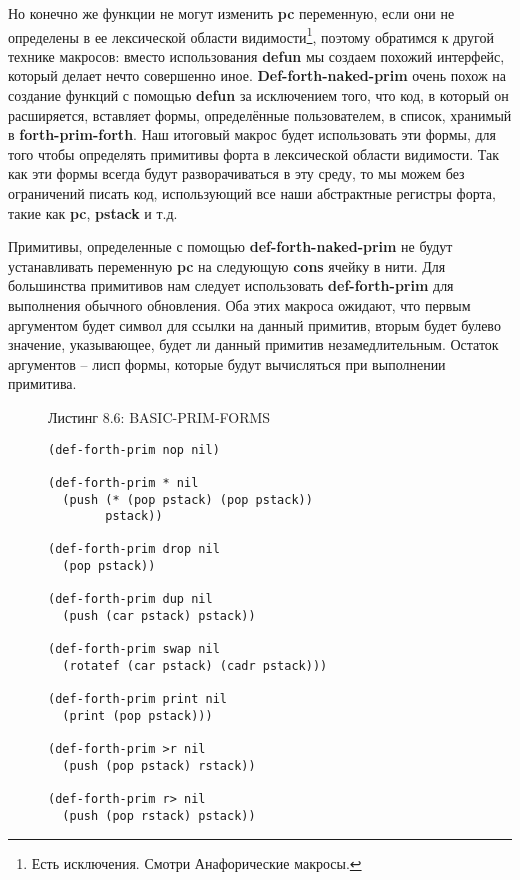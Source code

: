 Но конечно же функции не могут изменить \textbf{pc} переменную, если они не определены в ее лексической области видимости\footnote{Есть исключения. Смотри Анафорические макросы.}, поэтому обратимся к другой технике макросов: вместо использования \textbf{defun} мы создаем похожий интерфейс, который делает нечто совершенно иное. \textbf{Def-forth-naked-prim} очень похож на создание функций с помощью \textbf{defun} за исключением того, что код, в который он расширяется, вставляет формы, определённые пользователем, в список, хранимый в \textbf{forth-prim-forth}. Наш итоговый макрос будет использовать эти формы, для того чтобы определять примитивы форта в лексической области видимости. Так как эти формы всегда будут разворачиваться в эту среду, то мы можем без ограничений писать код, использующий все наши абстрактные регистры форта, такие как \textbf{pc}, \textbf{pstack} и т.д.

Примитивы, определенные с помощью \textbf{def-forth-naked-prim} не будут устанавливать переменную \textbf{pc} на следующую \textbf{cons} ячейку в нити. Для большинства примитивов нам следует использовать \textbf{def-forth-prim} для выполнения обычного обновления. Оба этих макроса ожидают, что первым аргументом будет символ для ссылки на данный примитив, вторым будет булево значение, указывающее, будет ли данный примитив незамедлительным. Остаток аргументов -- лисп формы, которые будут вычисляться при выполнении примитива.

\begin{figure}Листинг 8.6: BASIC-PRIM-FORMS\label{listing_8.6}
  \listbegin
\begin{verbatim}
(def-forth-prim nop nil)

(def-forth-prim * nil
  (push (* (pop pstack) (pop pstack))
        pstack))

(def-forth-prim drop nil
  (pop pstack))

(def-forth-prim dup nil
  (push (car pstack) pstack))

(def-forth-prim swap nil
  (rotatef (car pstack) (cadr pstack)))

(def-forth-prim print nil
  (print (pop pstack)))

(def-forth-prim >r nil
  (push (pop pstack) rstack))

(def-forth-prim r> nil
  (push (pop rstack) pstack))
\end{verbatim}
  \listend
\end{figure}

